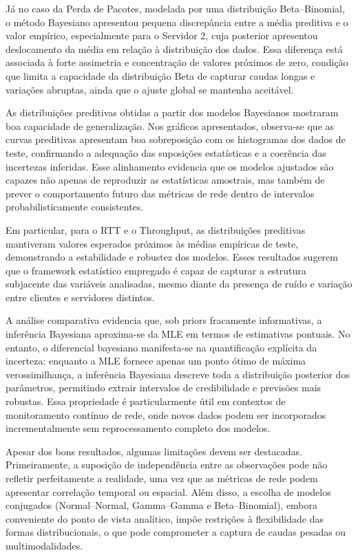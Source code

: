 \documentclass{article}
\begin{document}
Já no caso da Perda de Pacotes, modelada por uma distribuição Beta–Binomial,
o método Bayesiano apresentou pequena discrepância entre a média preditiva e o valor empírico,
especialmente para o Servidor 2, cuja posterior apresentou deslocamento da média em relação
à distribuição dos dados. Essa diferença está associada à forte assimetria e concentração
de valores próximos de zero, condição que limita a capacidade da distribuição Beta de capturar
caudas longas e variações abruptas, ainda que o ajuste global se mantenha aceitável.

As distribuições preditivas obtidas a partir dos modelos Bayesianos mostraram
boa capacidade de generalização.
Nos gráficos apresentados, observa-se que as curvas preditivas apresentam boa sobreposição com os histogramas dos dados de teste, confirmando a adequação das suposições estatísticas e a coerência
das incertezas inferidas.  
Esse alinhamento evidencia que os modelos ajustados são capazes não apenas de reproduzir
as estatísticas amostrais, mas também de prever o comportamento futuro das métricas de rede
dentro de intervalos probabilisticamente consistentes.

Em particular, para o RTT e o Throughput, as distribuições preditivas mantiveram
valores esperados próximos às médias empíricas de teste,
demonstrando a estabilidade e robustez dos modelos.  
Esses resultados sugerem que o framework estatístico empregado é capaz de
capturar a estrutura subjacente das variáveis analisadas, mesmo diante da
presença de ruído e variação entre clientes e servidores distintos.

A análise comparativa evidencia que, sob priors fracamente informativas,
a inferência Bayesiana aproxima-se da MLE em termos de estimativas pontuais.
No entanto, o diferencial bayesiano manifesta-se na quantificação explícita da incerteza:
enquanto a MLE fornece apenas um ponto ótimo de máxima verossimilhança,
a inferência Bayesiana descreve toda a distribuição posterior dos parâmetros,
permitindo extrair intervalos de credibilidade e previsões mais robustas.
Essa propriedade é particularmente útil em contextos de monitoramento contínuo de rede,
onde novos dados podem ser incorporados incrementalmente sem reprocessamento completo
dos modelos.

Apesar dos bons resultados, algumas limitações devem ser destacadas.
Primeiramente, a suposição de independência entre as observações pode não refletir
perfeitamente a realidade, uma vez que as métricas de rede podem apresentar correlação
temporal ou espacial.  
Além disso, a escolha de modelos conjugados (Normal–Normal, Gamma–Gamma e Beta–Binomial),
embora conveniente do ponto de vista analítico, impõe restrições à flexibilidade das formas
distribucionais, o que pode comprometer a captura de caudas pesadas ou multimodalidades.
\end{document}

